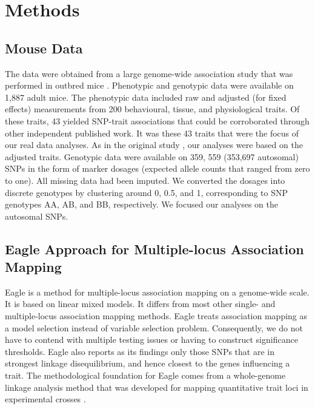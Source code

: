 \documentclass{nature}
\begin{document}
\section{Methods}


\subsection{Mouse Data}

The data were obtained from a large genome-wide association study that was performed in outbred mice \cite{nicod2016genome}. 
Phenotypic and genotypic data were available on 1,887 adult mice. 
The phenotypic data included raw and adjusted (for fixed effects) measurements from 200 behavioural, tissue, and physiological traits.  
Of these traits, 
43 yielded SNP-trait associations that could be corroborated through other independent published work. It was these 
43 traits that were the focus of our real data analyses. As in the original study  \cite{nicod2016genome}, our analyses 
were based on the adjusted traits.
Genotypic data were available on 359, 559 (353,697 autosomal) SNPs in the 
form of marker dosages (expected allele counts that ranged from zero to one). All missing data had been imputed. 
We converted the dosages into discrete genotypes 
by clustering around 0, 0.5, and 1, corresponding to SNP genotypes AA, AB, and BB, respectively. 
We focused our analyses on the autosomal SNPs.




\subsection{Eagle Approach for Multiple-locus Association Mapping}

Eagle is a method for multiple-locus association mapping on a genome-wide scale. It is based on linear mixed models. It differs from most other single- and multiple-locus association mapping methods. Eagle treats association mapping as a model selection instead of variable selection problem. Consequently,  we do not have to contend with multiple testing issues or having to construct significance thresholds.  
Eagle also 
reports as its findings only those SNPs that are in strongest linkage disequilibrium, and hence closest to the genes influencing a trait. 
The methodological foundation for Eagle comes from a whole-genome linkage analysis method that was developed for mapping 
quantitative trait loci in experimental crosses \cite{verbyla2007analysis}.
\end{document}
